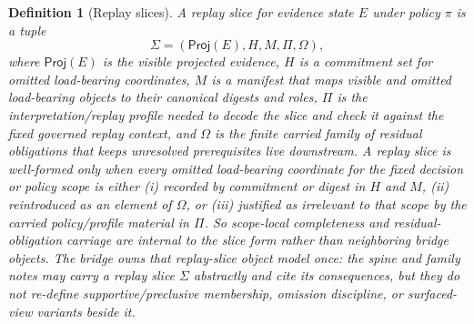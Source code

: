 \documentclass[11pt]{article}
\newtheorem{definition}{Definition}
\newcommand{\Proj}{\mathsf{Proj}}
\begin{document}
\begin{definition}[Replay slices]
A \emph{replay slice} for evidence state $E$ under policy $\pi$ is a tuple
\[
\Sigma=(\Proj(E),H,M,\Pi,\Omega),
\]
where $\Proj(E)$ is the visible projected evidence, $H$ is a commitment set for omitted load-bearing coordinates,
$M$ is a manifest that maps visible and omitted load-bearing objects to their canonical digests and roles,
$\Pi$ is the interpretation/replay profile needed to decode the slice and check it against the fixed governed replay context, and $\Omega$ is the finite carried family of residual obligations that keeps unresolved prerequisites live downstream.
A replay slice is well-formed only when every omitted load-bearing coordinate for the fixed decision or policy scope is either
(i) recorded by commitment or digest in $H$ and $M$, (ii) reintroduced as an element of $\Omega$, or (iii) justified as irrelevant to that scope by the carried policy/profile material in $\Pi$.
So scope-local completeness and residual-obligation carriage are internal to the slice form rather than neighboring bridge objects.
The bridge owns that replay-slice object model once: the spine and family notes may carry a replay slice $\Sigma$ abstractly and cite its consequences, but they do not re-define supportive/preclusive membership, omission discipline, or surfaced-view variants beside it.
\end{definition}
\end{document}
